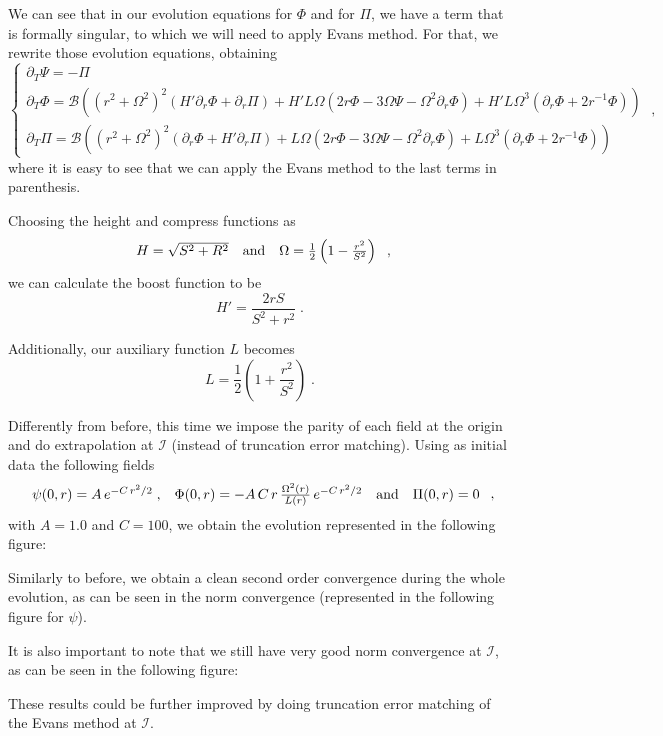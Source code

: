We can see that in our evolution equations for $\Phi$ and for $\Pi$, we have a term that is formally singular, to which we will need to apply Evans method. For that, we rewrite those evolution equations, obtaining
\begin{equation}
    \left\{ \begin{array}{l} 
        \partial_T \Psi = - \Pi \\ 
        \partial_T \Phi = \mathcal{B}\left((r^2 + \Omega^2)^2 \left(H' \partial_r \Phi + \partial_r\Pi\right) + H' L \Omega \left( 2r\Phi - 3 \Omega \Psi - \Omega^2 \partial_r \Phi\right) + H' L\Omega^3\left( \partial_r \Phi + 2 r^{-1}\Phi\right) \right)\\
        \partial_T \Pi = \mathcal{B}\left((r^2 + \Omega^2)^2 \left(\partial_r \Phi + H' \partial_r\Pi\right) + L \Omega \left( 2r\Phi - 3 \Omega \Psi - \Omega^2 \partial_r\Phi \right) + L \Omega^3\left( \partial_r \Phi + 2 r^{-1}\Phi \right) \right)
    \end{array} \right. \; ,
\end{equation}
where it is easy to see that we can apply the Evans method to the last terms in parenthesis.

Choosing the height and compress functions as
\begin{equation}
    \begin{array}{c c c}
        H = \sqrt{S^2 + R^2} & \text{and} & \Omega= \frac{1}{2}\left( 1 - \frac{r^2}{S^2} \right)
    \end{array}\; ,
\end{equation}
we can calculate the boost function to be 
\begin{equation}
    H'= \frac{2rS}{S^2+r^2}\; .
\end{equation}

Additionally, our auxiliary function $L$ becomes
\begin{equation}
    L = \frac{1}{2}\left( 1 + \frac{r^2}{S^2} \right) \; .
\end{equation}

Differently from before, this time we impose the parity of each field at the origin and do extrapolation at $\mathscr{I}$ (instead of truncation error matching). Using as initial data the following fields
\begin{equation}
    \begin{array}{c c c c}
        \psi(0,r) = A \, e^{-C \, r^2/2} \; , & \Phi(0,r) = - A \,C \, r \, \frac{\Omega^2(r)}{L(r)} \, e^{-C \, r^2/2} & \text{and} & \Pi(0,r) = 0
        \end{array} \; ,
\end{equation}
with $A = 1.0$ and $C = 100$, we obtain the evolution represented in the following figure:


Similarly to before, we obtain a clean second order convergence during the whole evolution, as can be seen in the norm convergence (represented in the following figure for $\psi$).


It is also important to note that we still have very good norm convergence at $\mathscr{I}$, as can be seen in the following figure:

These results could be further improved by doing truncation error matching of the Evans method at $\mathscr{I}$.